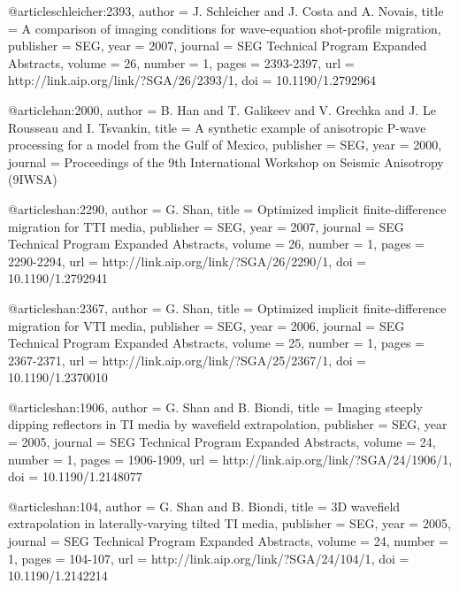 {@article{schleicher:2393,
  author =	 {J. Schleicher and J. Costa and
                  A. Novais},
  title =	 {A comparison of imaging conditions for wave-equation
                  shot-profile migration},
  publisher =	 {SEG},
  year =	 2007,
  journal =	 {SEG Technical Program Expanded Abstracts},
  volume =	 26,
  number =	 1,
  pages =	 {2393-2397},
  url =		 {http://link.aip.org/link/?SGA/26/2393/1},
  doi =		 {10.1190/1.2792964}
}

@article{han:2000,
  author =	 {B. Han and T. Galikeev and V. Grechka
                  and J. Le Rousseau and I. Tsvankin},
  title =	 {A synthetic example of anisotropic {P}-wave
                  processing for a model from the {G}ulf of {M}exico},
  publisher =	 {SEG},
  year =	 2000,
  journal =	 {Proceedings of the 9th International Workshop on
                  Seismic Anisotropy (9IWSA)}
}

@article{shan:2290,
  author =	 {G. Shan},
  title =	 {Optimized implicit finite-difference migration for
                  {TTI} media},
  publisher =	 {SEG},
  year =	 2007,
  journal =	 {SEG Technical Program Expanded Abstracts},
  volume =	 26,
  number =	 1,
  pages =	 {2290-2294},
  url =		 {http://link.aip.org/link/?SGA/26/2290/1},
  doi =		 {10.1190/1.2792941}
}

@article{shan:2367,
  author =	 {G. Shan},
  title =	 {Optimized implicit finite-difference migration for
                  {VTI} media},
  publisher =	 {SEG},
  year =	 2006,
  journal =	 {SEG Technical Program Expanded Abstracts},
  volume =	 25,
  number =	 1,
  pages =	 {2367-2371},
  url =		 {http://link.aip.org/link/?SGA/25/2367/1},
  doi =		 {10.1190/1.2370010}
}

@article{shan:1906,
  author =	 {G. Shan and B. Biondi},
  title =	 {Imaging steeply dipping reflectors in {TI} media by
                  wavefield extrapolation},
  publisher =	 {SEG},
  year =	 2005,
  journal =	 {SEG Technical Program Expanded Abstracts},
  volume =	 24,
  number =	 1,
  pages =	 {1906-1909},
  url =		 {http://link.aip.org/link/?SGA/24/1906/1},
  doi =		 {10.1190/1.2148077}
}

@article{shan:104,
  author =	 {G. Shan and B. Biondi},
  title =	 {{3D} wavefield extrapolation in laterally-varying
                  tilted {TI} media},
  publisher =	 {SEG},
  year =	 2005,
  journal =	 {SEG Technical Program Expanded Abstracts},
  volume =	 24,
  number =	 1,
  pages =	 {104-107},
  url =		 {http://link.aip.org/link/?SGA/24/104/1},
  doi =		 {10.1190/1.2142214}
}

}
